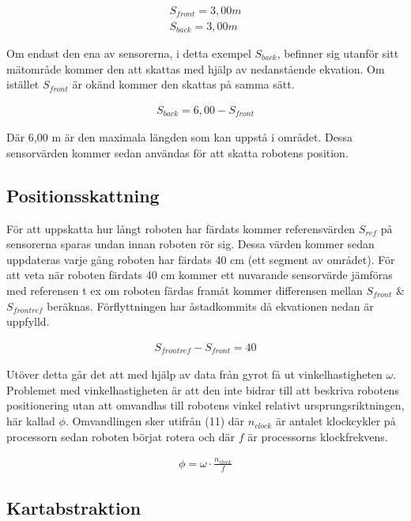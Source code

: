 \documentclass[a4paper,12pt,fleqn]{article}
\begin{document}
\begin{gather}
	S_{front}=3,00 m \\
	S_{back}=3,00 m
\end{gather}

Om endast den ena av sensorerna, i detta exempel $S_{back}$, befinner sig utanför sitt mätområde kommer den att skattas med hjälp av nedanstående ekvation. Om istället $S_{front}$ är okänd kommer den skattas på samma sätt. 

\begin{gather}
	S_{back}=6,00-S_{front}
\end{gather}

Där 6,00 m är den maximala längden som kan uppstå i området. Dessa sensorvärden kommer sedan användas för att skatta robotens position.



\subsection{Positionsskattning}

För att uppskatta hur långt roboten har färdats kommer referensvärden $S_{ref}$ på sensorerna sparas undan innan roboten rör sig. Dessa värden kommer sedan uppdateras varje gång roboten har färdats 40 cm (ett segment av området). För att veta när roboten färdats 40 cm kommer ett nuvarande sensorvärde jämföras med referensen t ex om roboten färdas framåt kommer differensen mellan $S_{front}$ \& $S_{frontref}$ beräknas. Förflyttningen har åstadkommits då ekvationen nedan är uppfylld. 

\begin{gather}
	S_{frontref} - S_{front} = 40
\end{gather}

Utöver detta går det att med hjälp av data från gyrot få ut vinkelhastigheten $\omega$. Problemet med vinkelhastigheten är att den inte bidrar till att beskriva robotens positionering utan att omvandlas till robotens vinkel relativt ursprungsriktningen, här kallad $\phi$. Omvandlingen sker utifrån (11) där $n_{clock}$ är antalet klockcykler på processorn sedan roboten börjat rotera och där $f$ är processorns klockfrekvens.

\begin{gather}
	\phi = \omega \cdot \frac{n_{clock}}{f}
\end{gather} 

\subsection{Kartabstraktion}
\end{document}
